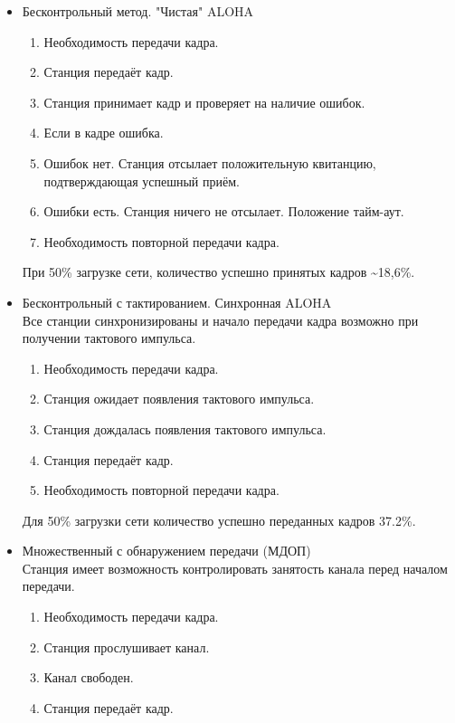 \documentclass[12pt, russian, oneside, article]{ncc}
\begin{document}
\begin{itemize}

\item Бесконтрольный метод. "Чистая" ALOHA\\
\label{sec-5_1_1_1}%
\begin{enumerate}
\item Необходимость передачи кадра.
\item Станция передаёт кадр.
\item Станция принимает кадр и проверяет на наличие ошибок.
\item Если в кадре ошибка.
\item Ошибок нет. Станция отсылает положительную квитанцию, подтверждающая успешный приём.
\item Ошибки есть. Станция ничего не отсылает. Положение тайм-аут.
\item Необходимость повторной передачи кадра.
\end{enumerate}

При 50\% загрузке сети, количество успешно принятых кадров \~{}18,6\%.


\item Бесконтрольный с тактированием. Синхронная ALOHA\\
\label{sec-5_1_1_2}%
Все станции синхронизированы и начало передачи кадра возможно при получении тактового импульса.

\begin{enumerate}
\item Необходимость передачи кадра.
\item Станция ожидает появления тактового импульса.
\item Станция дождалась появления тактового импульса.
\item Станция передаёт кадр.
\item Необходимость повторной передачи кадра.
\end{enumerate}

Для 50\% загрузки сети количество успешно переданных кадров 37.2\%.


\item Множественный с обнаружением передачи (МДОП)\\
\label{sec-5_1_1_3}%
Станция имеет возможность контролировать занятость канала перед началом передачи.

\begin{enumerate}
\item Необходимость передачи кадра.
\item Станция прослушивает канал.
\item Канал свободен.
\item Станция передаёт кадр.
\end{enumerate}


\end{itemize}
\end{document}
